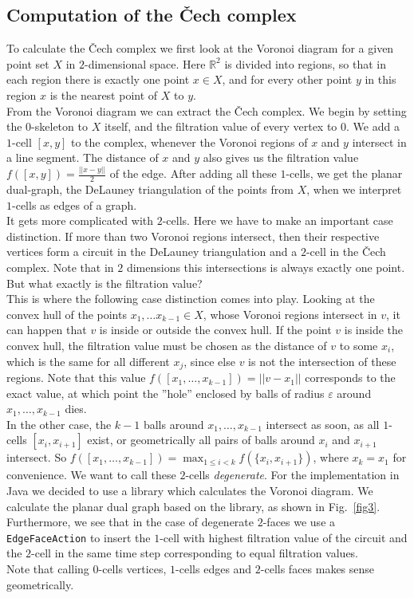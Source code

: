 \documentclass[11pt, a4paper, UKenglish]{article}
\newcommand{\bR}{\mathbb{R}}
\begin{document}
    \subsection{Computation of the Čech complex}\label{subsec:čech-complex}

    To calculate the Čech complex we first look at the Voronoi diagram for a given point set $X$ in $2$-dimensional space.
    Here $\bR^2$ is divided into regions, so that in each region there is exactly one point $x\in X$, and for every other point $y$ in this region $x$ is the nearest point of $X$ to $y$.\\
    From the Voronoi diagram we can extract the Čech complex.
    We begin by setting the $0$-skeleton to $X$ itself, and the filtration value of every vertex to $0$.
    We add a $1$-cell $[x,y]$ to the complex, whenever the Voronoi regions of $x$ and $y$ intersect in a line segment.
    The distance of $x$ and $y$ also gives us the filtration value $f([x,y]) = \frac{||x-y||}{2}$ of the edge.
    After adding all these $1$-cells, we get the planar dual-graph, the DeLauney triangulation of the points from $X$, when we interpret $1$-cells as edges of a graph.\\
    It gets more complicated with $2$-cells.
    Here we have to make an important case distinction.
    If more than two Voronoi regions intersect, then their respective vertices form a circuit in the DeLauney triangulation and a $2$-cell in the Čech complex.
    Note that in $2$ dimensions this intersections is always exactly one point.
    But what exactly is the filtration value?\\
    This is where the following case distinction comes into play.
    Looking at the convex hull of the points $x_1,\ldots x_{k-1}\in X$, whose Voronoi regions intersect in $v$, it can happen that $v$ is inside or outside the convex hull.
    If the point $v$ is inside the convex hull, the filtration value must be chosen as the distance of $v$ to some $x_i$, which is the same for all different $x_j$, since else $v$ is not the intersection of these regions.
    Note that this value $f([x_1,\ldots,x_{k-1}])=||v-x_1||$ corresponds to the exact value, at which point the ''hole'' enclosed by balls of radius $\varepsilon$ around $x_1,\ldots,x_{k-1}$ dies.\\
    
    In the other case, the $k-1$ balls around $x_1,\ldots,x_{k-1}$ intersect as soon, as all $1$-cells $[x_i,x_{i+1}]$ exist, or geometrically all pairs of balls around $x_i$ and $x_{i+1}$ intersect.
    So $f([x_1,\ldots,x_{k-1}])=\max_{1\leq i<k} f(\{x_i,x_{i+1}\})$, where $x_k=x_1$ for convenience.
    We want to call these $2$-cells \textit{degenerate}.
    For the implementation in Java we decided to use a library which calculates the Voronoi diagram.
    We calculate the planar dual graph based on the library, as shown in Fig.~\ref{fig3}.
    Furthermore, we see that in the case of degenerate $2$-faces we use a \texttt{EdgeFaceAction} to insert the $1$-cell with highest filtration value of the circuit and the $2$-cell in the same time step corresponding to equal filtration values.\\
    Note that calling $0$-cells vertices, $1$-cells edges and $2$-cells faces makes sense geometrically.
\end{document}
